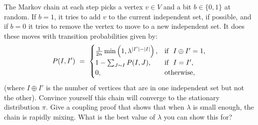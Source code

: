 \documentclass{article}
\begin{document}
   \vspace{3mm}
  The Markov chain at each step picks a vertex $v \in V$ and a bit
  $b \in \{0, 1\}$ at random. If $b = 1$, it tries to add $v$ to the current independent set, if
  possible, and if $b=0$ it tries to remove the vertex to move to a new
  independent set.  It does these moves with transition probabilities given
  by:
   $$P(I,I') \ =\ 
   \begin{cases} \frac{1}{2n} \min\left( 1,
     \lambda^{|I'|-|I|}\right), & \hbox{if \ } I\oplus I'=1,\cr 1-\sum_{J\sim
     I} P(I,J), & \hbox{if \ } I=I',\cr 0, & \hbox{otherwise, \ }\cr
   \end{cases}$$
  (where $I \oplus I'$ is the number of vertices that are in one independent set
  but not the other).  Convince yourself this chain will converge to the
  stationary distribution $\pi$.  Give a coupling proof that shows that when
  $\lambda$ is small enough, the chain is rapidly mixing.  What is the best
  value of $\lambda$ you can show this for?


\end{document}
